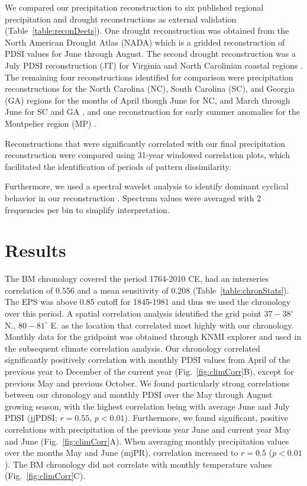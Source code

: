 We compared our precipitation reconstruction to six published regional
precipitation and drought reconstructions as external validation
(Table~\ref{table:reconDeets}). One drought reconstruction was obtained
from the North American Drought Atlas (NADA) \cite{cook1999drought} which
is a gridded reconstruction of PDSI values for June through August. The
second drought reconstruction was a July PDSI reconstruction (JT) for
Virginia and North Carolinian coastal regions \cite{stahle1998lost}. The
remaining four reconstructions identified for comparison were
precipitation reconstructions for the North Carolina (NC), South Carolina
(SC), and Georgia (GA) regions for the months of April though June for NC,
and March through June for SC and GA \cite{stahle1992reconstruction},
and one reconstruction for early summer anomalies for the Montpelier
region (MP) \cite{druckenbrod2003late}.

Reconstructions that were significantly correlated with our final
precipitation reconstruction were compared using 31-year windowed
correlation plots, which facilitated the identification of periods of
pattern dissimilarity.

Furthermore, we used a spectral wavelet analysis to
identify dominant cyclical behavior in our reconstruction
\cite{torrence1998practical}. Spectrum values were averaged with 2
frequencies per bin to simplify interpretation.


\section{Results}

The BM chronology covered the period 1764-2010 CE, had an
interseries correlation of 0.556 and a mean sensitivity of 0.208
(Table~\ref{table:chronStats}). The EPS was above 0.85 cutoff for
1845-1981 and thus we used the chronology over this period. A spatial
correlation analysis identified the grid point $37-38^{\circ}$ N.,
$80-81^{\circ}$ E. as the location that correlated most highly with our
chronology. Monthly data for the gridpoint was obtained through KNMI
explorer and used in the subsequent climate correlation analysis. Our
chronology correlated significantly positively correlation with monthly
PDSI values from April of the previous year to December of the current
year (Fig.~\ref{fig:climCorr}B), except for previous May and previous
October. We found particularly strong correlations between our chronology
and monthly PDSI over the May through August growing season, with the
highest correlation being with average June and July PDSI (jjPDSI;
$r=0.55$, $p<0.01$). Furthermore, we found significant, positive
correlations with precipitation of the previous year June and current
year May and June (Fig.~\ref{fig:climCorr}A). When averaging monthly
precipitation values over the months May and June (mjPR), correlation
increased to $r=0.5$ ($p<0.01$). The BM chronology did not correlate
with monthly temperature values (Fig.~\ref{fig:climCorr}C).

